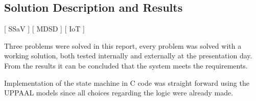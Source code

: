 \subsection{Solution Description and Results}
[ SSaV ] [ MDSD ] [ IoT ] 
\newline

Three problems were solved in this report, every problem was solved with a working solution, both tested internally and externally at the presentation day.
From the results it can be concluded that the system meets the requirements.


Implementation of the state machine in C code was straight forward using the UPPAAL models since all choices regarding the logic were already made.
